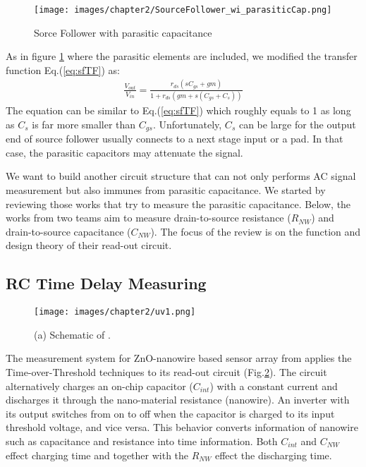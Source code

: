 \begin{figure}[ht]
    \centering
    \texttt{[image: images/chapter2/SourceFollower\_wi\_parasiticCap.png]}
    \fontsize{6}{7}\selectfont
    \caption{Sorce Follower with parasitic capacitance}
    \label{fig:SF_pC}
\end{figure}

As in figure \ref{fig:SF_pC} where the parasitic elements are included, we modified the transfer function Eq.(\ref{eq:sfTF}) as:
\begin{align}
    \frac{V_{out}}{V_{in}} = \frac{r_{ds}(sC_{gs} + gm)}{1 + r_{ds}(gm + s(C_{gs}+C_s))}
\end{align}
The equation can be similar to Eq.(\ref{eq:sfTF}) which roughly equals to 1 as long as $C_s$ is far more smaller than $C_{gs}$.
Unfortunately, $C_s$ can be large for the output end of source follower usually connects to a next stage input or a pad.
In that case, the parasitic capacitors may attenuate the signal.

We want to build another circuit structure that can not only performs AC signal measurement but also immunes from parasitic capacitance.
We started by reviewing those works that try to measure the parasitic capacitance.
Below, the works from two teams aim to measure drain-to-source resistance ($R_{NW}$) and drain-to-source capacitance ($C_{NW}$).
The focus of the review is on the function and design theory of their read-out circuit.


\subsection{RC Time Delay Measuring}
\begin{figure}[!htbp]
    \centering
    \texttt{[image: images/chapter2/uv1.png]}
    \caption{(a) Schematic of \cite{Juv1}.}
    \label{fig:tot1}
\end{figure}

The measurement system for ZnO-nanowire based sensor array from \cite{Juv1} applies the Time-over-Threshold techniques to its read-out circuit (Fig.\ref{fig:tot1}).
The circuit alternatively charges an on-chip capacitor ($C_{int}$) with a constant current and discharges it through the nano-material resistance (nanowire).
An inverter with its output switches from on to off when the capacitor is charged to its input threshold voltage, and vice versa.
This behavior converts information of nanowire such as capacitance and resistance into time information.
Both $C_{int}$ and $C_{NW}$ effect charging time and together with the $R_{NW}$ effect the discharging time.

